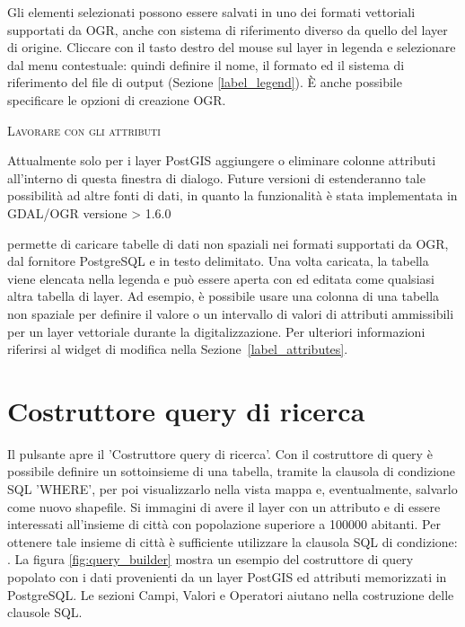 
Gli elementi selezionati possono essere salvati in uno dei formati vettoriali supportati da OGR, 
anche con sistema di riferimento diverso da quello del layer di origine.
Cliccare con il tasto destro del mouse sul layer in legenda e selezionare 
 dal menu contestuale: quindi definire il
nome, il formato ed il sistema di riferimento del file di output (Sezione \ref{label_legend}). 
È anche possibile specificare le opzioni di creazione OGR.

\begin{Tip}\caption{\textsc{Lavorare con gli attributi}}
Attualmente solo per i layer PostGIS aggiungere o eliminare colonne attributi 
all'interno di questa finestra di dialogo. Future versioni di \qg estenderanno tale possibilità ad altre
fonti di dati, in quanto la funzionalità è stata implementata in GDAL/OGR versione > 1.6.0
\end{Tip}


\qg permette di caricare tabelle di dati non spaziali nei formati supportati da OGR, dal fornitore 
PostgreSQL e in testo delimitato. Una volta caricata, la tabella viene elencata nella
legenda e può essere aperta con  
ed editata come qualsiasi altra tabella di layer.
Ad esempio, è possibile usare una colonna di una tabella non spaziale per definire il valore
o un intervallo di valori di attributi ammissibili per un layer vettoriale durante la digitalizzazione.
Per ulteriori informazioni riferirsi al widget di modifica nella Sezione~\ref{label_attributes}.

\section{Costruttore query di ricerca}\label{sec:query_builder}

Il pulsante  apre il 'Costruttore query di ricerca'.
Con il costruttore di query è possibile definire un sottoinsieme di una tabella,
tramite la clausola di condizione SQL 'WHERE', per poi visualizzarlo nella vista
mappa e, eventualmente, salvarlo come nuovo shapefile.
Si immagini di avere il layer  con un attributo 
 e di essere interessati all'insieme di città con 
popolazione superiore a 100000 abitanti. Per ottenere tale insieme di città
è sufficiente utilizzare la clausola SQL di condizione: .
La figura \ref{fig:query_builder} mostra un esempio del costruttore di query
popolato con i dati provenienti da un layer PostGIS ed attributi memorizzati 
in PostgreSQL. Le sezioni Campi, Valori e Operatori aiutano nella costruzione delle 
clausole SQL.

